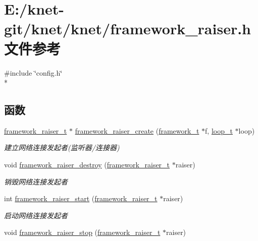 \hypertarget{a00058}{}\section{E\+:/knet-\/git/knet/knet/framework\+\_\+raiser.h 文件参考}
\label{a00058}
{\ttfamily \#include \char`\"{}config.\+h\char`\"{}}\\*
\subsection*{函数}
\begin{DoxyCompactItemize}
\item 
\hyperlink{a00050_aa3ac31db191829c9e6db624d660a2563_aa3ac31db191829c9e6db624d660a2563}{framework\+\_\+raiser\+\_\+t} $\ast$ \hyperlink{a00058_a6a305a33afdea0d9b774d4b987aff05e_a6a305a33afdea0d9b774d4b987aff05e}{framework\+\_\+raiser\+\_\+create} (\hyperlink{a00050_a6149d769f6f07ed14a40a271c95d8463_a6149d769f6f07ed14a40a271c95d8463}{framework\+\_\+t} $\ast$f, \hyperlink{a00050_a9c3ad1cd2de83e09f3a7b59fa82c94ee_a9c3ad1cd2de83e09f3a7b59fa82c94ee}{loop\+\_\+t} $\ast$loop)
\begin{DoxyCompactList}\small\item\em 建立网络连接发起者(监听器/连接器) \end{DoxyCompactList}\item 
void \hyperlink{a00058_aeb1e0bff411b59cc3ec79da5ab23d2c1_aeb1e0bff411b59cc3ec79da5ab23d2c1}{framework\+\_\+raiser\+\_\+destroy} (\hyperlink{a00050_aa3ac31db191829c9e6db624d660a2563_aa3ac31db191829c9e6db624d660a2563}{framework\+\_\+raiser\+\_\+t} $\ast$raiser)
\begin{DoxyCompactList}\small\item\em 销毁网络连接发起者 \end{DoxyCompactList}\item 
int \hyperlink{a00058_a72206fc25182b20ead062464ed0b1139_a72206fc25182b20ead062464ed0b1139}{framework\+\_\+raiser\+\_\+start} (\hyperlink{a00050_aa3ac31db191829c9e6db624d660a2563_aa3ac31db191829c9e6db624d660a2563}{framework\+\_\+raiser\+\_\+t} $\ast$raiser)
\begin{DoxyCompactList}\small\item\em 启动网络连接发起者 \end{DoxyCompactList}\item 
void \hyperlink{a00058_a28061890dd7d07a16df39417ada87107_a28061890dd7d07a16df39417ada87107}{framework\+\_\+raiser\+\_\+stop} (\hyperlink{a00050_aa3ac31db191829c9e6db624d660a2563_aa3ac31db191829c9e6db624d660a2563}{framework\+\_\+raiser\+\_\+t} $\ast$raiser)

\end{DoxyCompactItemize}
